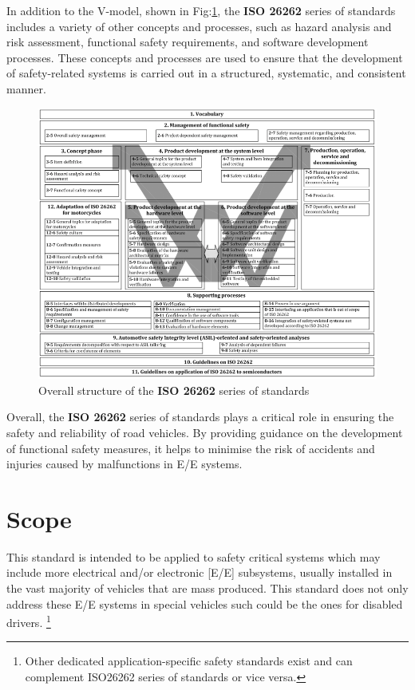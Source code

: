 \documentclass[./dissertation.tex]{subfiles}
\begin{document}
In addition to the V-model, shown in Fig:\ref{fig:ISO_26262_structure}, the \textbf{ISO 26262} series of standards includes a variety of other concepts and processes, such as hazard analysis and risk assessment, functional safety requirements, and software development processes. These concepts and processes are used to ensure that the development of safety-related systems is carried out in a structured, systematic, and consistent manner.
\begin{figure}[H]
\centering
\includegraphics[scale=0.6]{subfiles/imgs/ISO_26262_structure.png}
\caption{Overall structure of the \textbf{ISO 26262} series of standards}
\label{fig:ISO_26262_structure}
\end{figure}
\restoregeometry
Overall, the \textbf{ISO 26262} series of standards plays a critical role in ensuring the safety and reliability of road vehicles. By providing guidance on the development of functional safety measures, it helps to minimise the risk of accidents and injuries caused by malfunctions in E/E systems.

\section{Scope}
This standard is intended to be applied to safety critical systems which may include more electrical and/or electronic [E/E] subsystems, usually installed in the vast majority of vehicles that are mass produced. This standard does not only address these E/E systems in special vehicles such could be the ones for disabled drivers. \footnote{ Other dedicated application-specific safety standards exist and can complement ISO26262 series of standards or vice versa.}
\end{document}
